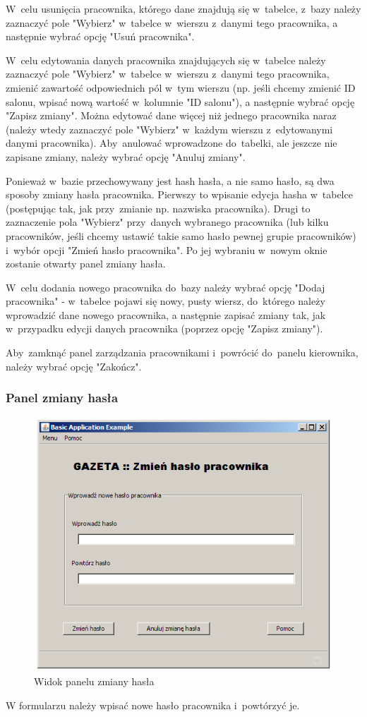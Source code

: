 W~celu usunięcia pracownika, którego dane znajdują się w~tabelce, z~bazy należy zaznaczyć pole "Wybierz" w~tabelce w~wierszu z~danymi tego pracownika, a następnie wybrać opcję "Usuń pracownika".

W~celu edytowania danych pracownika znajdujących się w~tabelce należy zaznaczyć pole "Wybierz" w~tabelce w~wierszu z~danymi tego pracownika, zmienić zawartość odpowiednich pól w~tym wierszu (np. jeśli chcemy zmienić ID salonu, wpisać nową wartość w~kolumnie "ID salonu"), a następnie wybrać opcję "Zapisz zmiany". Można edytować dane więcej niż jednego pracownika naraz (należy wtedy zaznaczyć pole "Wybierz" w~każdym wierszu z~edytowanymi danymi pracownika). Aby~anulować wprowadzone do~tabelki, ale jeszcze nie zapisane zmiany, należy wybrać opcję "Anuluj zmiany".

Ponieważ w~bazie przechowywany jest hash hasła, a nie samo hasło, są dwa sposoby zmiany hasła pracownika. Pierwszy to wpisanie edycja hasha w~tabelce (postępując tak, jak przy~zmianie np. nazwiska pracownika). Drugi to zaznaczenie pola "Wybierz" przy~danych wybranego pracownika (lub kilku pracowników, jeśli chcemy ustawić takie samo hasło pewnej grupie pracowników) i~wybór opcji "Zmień hasło pracownika". Po jej wybraniu w~nowym oknie zostanie otwarty panel zmiany hasła.

W~celu dodania nowego pracownika do~bazy należy wybrać opcję "Dodaj pracownika" - w~tabelce pojawi się nowy, pusty wiersz, do~którego należy wprowadzić dane nowego pracownika, a następnie zapisać zmiany tak, jak w~przypadku edycji danych pracownika (poprzez opcję "Zapisz zmiany").

Aby~zamknąć panel zarządzania pracownikami i~powrócić do~panelu kierownika, należy wybrać opcję "Zakończ".
\clearpage
\subsubsection{Panel zmiany hasła}
\begin{figure}[h]
\includegraphics[width=1\textwidth]{gfx/zmiana_hasla.png}
\caption{Widok panelu zmiany hasła}
\end{figure}
W formularzu należy wpisać nowe hasło pracownika i~powtórzyć je.

